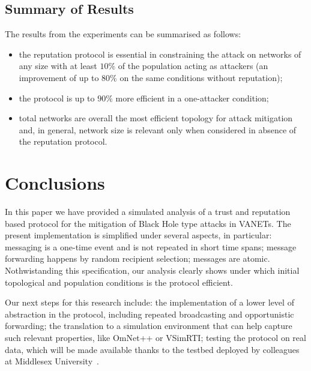 \documentclass[compsoc, conference, letterpaper, 10pt, times]{IEEEtran}
\begin{document}
\subsection{Summary of Results}

The results from the experiments can be summarised as follows:
\begin{itemize}
\item the reputation protocol is essential in constraining the attack on networks of any size with at least $10\%$ of the population acting as attackers (an improvement of up to $80\%$ on the same conditions without reputation);
\item the protocol is up to $90\%$ more efficient in a one-attacker condition;
\item total networks are overall the most efficient topology for attack mitigation and, in general, network size is relevant only when considered in absence of the reputation protocol.
\end{itemize}

\section{Conclusions}

In this paper we have provided a simulated analysis of a trust and reputation based protocol for the mitigation of Black Hole type attacks in VANETs. The present implementation is simplified under several aspects, in particular: messaging is a one-time event and is not repeated in short time spans; message forwarding happens by random recipient selection; messages are atomic. Nothwistanding this specification, our analysis clearly shows under which initial topological and population conditions is the protocol efficient.

Our next steps for this research include: the implementation of a lower level of abstraction in the protocol, including repeated broadcasting and opportunistic forwarding; the translation to a simulation environment that can help capture such relevant properties, like OmNet++ or VSimRTI; testing the protocol on real data, which will be made available thanks to the testbed deployed by colleagues at Middlesex University~\cite{10.1007/978-3-319-49580-4_8}.

\medskip


%


\end{document}
